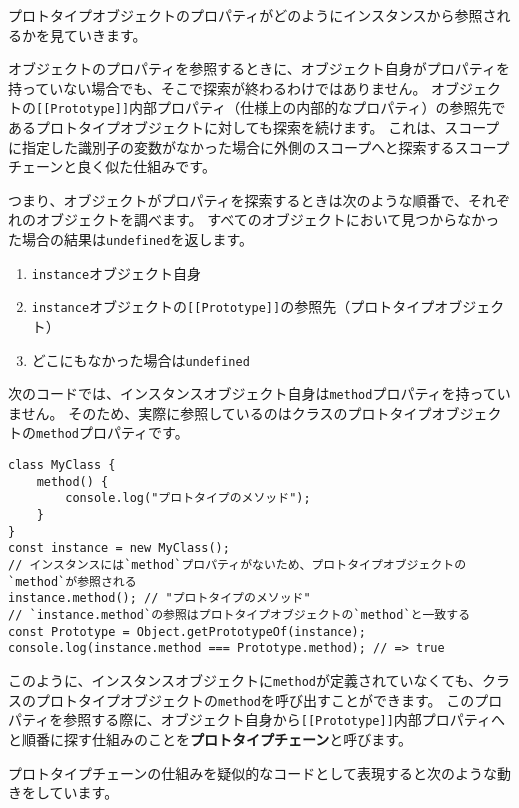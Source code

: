 プロトタイプオブジェクトのプロパティがどのようにインスタンスから参照されるかを見ていきます。

オブジェクトのプロパティを参照するときに、オブジェクト自身がプロパティを持っていない場合でも、そこで探索が終わるわけではありません。
オブジェクトの\texttt{[[Prototype]]}内部プロパティ（仕様上の内部的なプロパティ）の参照先であるプロトタイプオブジェクトに対しても探索を続けます。
これは、スコープに指定した識別子の変数がなかった場合に外側のスコープへと探索するスコープチェーンと良く似た仕組みです。

つまり、オブジェクトがプロパティを探索するときは次のような順番で、それぞれのオブジェクトを調べます。
すべてのオブジェクトにおいて見つからなかった場合の結果は\texttt{undefined}を返します。

\begin{enumerate}
\def\labelenumi{\arabic{enumi}.}
\item
  \texttt{instance}オブジェクト自身
\item
  \texttt{instance}オブジェクトの\texttt{[[Prototype]]}の参照先（プロトタイプオブジェクト）
\item
  どこにもなかった場合は\texttt{undefined}
\end{enumerate}

次のコードでは、インスタンスオブジェクト自身は\texttt{method}プロパティを持っていません。
そのため、実際に参照しているのはクラスのプロトタイプオブジェクトの\texttt{method}プロパティです。

\begin{lstlisting}
class MyClass {
    method() {
        console.log("プロトタイプのメソッド");
    }
}
const instance = new MyClass();
// インスタンスには`method`プロパティがないため、プロトタイプオブジェクトの`method`が参照される
instance.method(); // "プロトタイプのメソッド"
// `instance.method`の参照はプロトタイプオブジェクトの`method`と一致する
const Prototype = Object.getPrototypeOf(instance);
console.log(instance.method === Prototype.method); // => true
\end{lstlisting}

このように、インスタンスオブジェクトに\texttt{method}が定義されていなくても、クラスのプロトタイプオブジェクトの\texttt{method}を呼び出すことができます。
このプロパティを参照する際に、オブジェクト自身から\texttt{[[Prototype]]}内部プロパティへと順番に探す仕組みのことを\textbf{プロトタイプチェーン}と呼びます。

プロトタイプチェーンの仕組みを疑似的なコードとして表現すると次のような動きをしています。

